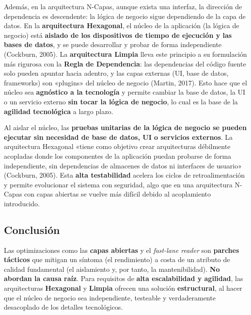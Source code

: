 \documentclass[11pt,a4paper]{article}
\begin{document}
Además, en la arquitectura N-Capas, aunque exista una interfaz, la dirección de dependencia es
descendente: la lógica de negocio sigue dependiendo de la capa de datos. En la
\textbf{arquitectura Hexagonal}, el núcleo de la aplicación (la lógica de negocio) está
\textbf{aislado de los dispositivos de tiempo de ejecución y las bases de datos}, y se puede
desarrollar y probar de forma independiente (Cockburn, 2005). La \textbf{arquitectura Limpia}
lleva este principio a su formulación más rigurosa con la \textbf{Regla de Dependencia}: las
dependencias del código fuente solo pueden apuntar hacia adentro, y las capas externas (UI,
base de datos, frameworks) son «plugins» del núcleo de negocio (Martin, 2017). Esto hace que
el núcleo sea \textbf{agnóstico a la tecnología} y permite cambiar la base de datos, la UI o
un servicio externo \textbf{sin tocar la lógica de negocio}, lo cual es la base de la
\textbf{agilidad tecnológica} a largo plazo.

Al aislar el núcleo, las \textbf{pruebas unitarias de la lógica de negocio se pueden ejecutar
sin necesidad de base de datos, UI o servicios externos}. La arquitectura Hexagonal «tiene como
objetivo crear arquitecturas débilmente acopladas donde los componentes de la aplicación puedan
probarse de forma independiente, sin dependencias de almacenes de datos ni interfaces de
usuario» (Cockburn, 2005). Esta \textbf{alta testabilidad} acelera los ciclos de
retroalimentación y permite evolucionar el sistema con seguridad, algo que en una
arquitectura N-Capas con capas abiertas se vuelve más difícil debido al acoplamiento
introducido.

\subsection*{Conclusión}

Las optimizaciones como las \textbf{capas abiertas} y el \emph{fast-lane reader} son
\textbf{parches tácticos} que mitigan un síntoma (el rendimiento) a costa de un atributo de
calidad fundamental (el aislamiento y, por tanto, la mantenibilidad). \textbf{No abordan la
causa raíz}. Para requisitos de \textbf{alta escalabilidad y agilidad}, las arquitecturas
\textbf{Hexagonal} y \textbf{Limpia} ofrecen una solución \textbf{estructural}, al hacer que el
núcleo de negocio sea independiente, testeable y verdaderamente desacoplado de los detalles
tecnológicos.

\newpage
\end{document}
